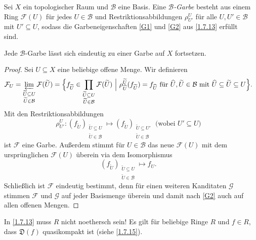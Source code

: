 \documentclass[a4paper,12pt,index=toc]{scrbook}
\theoremstyle{keinenummern} %
\newcommand{\D}{\mathfrak{D}}
\def\B{\mathcal{B}}
\newcommand{\F}{\mathcal{F}}
\def\G{\mathcal{G}}
\newcommand{\schlange}[1]{\widetilde{#1}}
\newcommand{\dach}{\widehat}
\begin{document}
\begin{lem}\label{1.7.14}
  Sei $X$ ein topologischer Raum und $\B$ eine Basis. Eine \emph{$\B$-Garbe\index{$\B$-Garbe}} besteht aus einem Ring
  $\F(U)$ für jedes $U\in\B$ und Restriktionsabbildungen $\rho_{U'}^U$ für alle $U,U'\in\B$ mit
  $U'\subseteq U$, sodass die Garbeneigenschaften \ref{G1} und \ref{G2} aus \cref{1.7.13} erfüllt sind.

  Jede $\B$-Garbe lässt sich eindeutig zu einer Garbe auf $X$ fortsetzen.
\end{lem}
\begin{proof}
  Sei $U\subseteq X$ eine beliebige offene Menge. Wir definieren
  \begin{equation*} \F_U = \varprojlim_{\substack{\schlange{U}\subseteq U\\\schlange{U}\in\B}}\F(\schlange{U}) =
     \Bigl\{f_{\schlange{U}}\in\prod_{\substack{\schlange{U}\subseteq U\\\schlange{U}\in\B}}\F(\schlange{U}) \ \Big|\ 
     \rho_{\dach{U}}^{\schlange{U}}(f_{\schlange{U}})=f_{\dach{U}}\text{ für }
     \dach{U},\schlange{U}\in\B \text{ mit } \dach{U}\subseteq\schlange{U}\subseteq U \Bigr\}. \end{equation*}
     Mit den Restriktionsabbildungen
     \begin{equation*}\rho_{U'}^U\colon (f_{\schlange{U}})_{\substack{\schlange{U}\subseteq U\\\schlange{U}\in\B}} \mapsto
     (f_{\schlange{U}})_{\substack{\schlange{U}\subseteq U'\\\schlange{U}\in\B}} \text{ (wobei $U'\subseteq U$)}\end{equation*} 
     ist $\F$ eine
     Garbe. Außerdem stimmt für $U\in\B$ das neue $\F(U)$ mit dem ursprünglichen $\F(U)$ überein via
     dem Isomorphismus 
     \begin{equation*}(f_{\schlange{U}})_{\substack{\schlange{U}\subseteq U\\\schlange{U}\in\B}} \mapsto f_U.\end{equation*}
     Schließlich ist $\F$ eindeutig bestimmt, denn für einen weiteren Kanditaten $\G$ stimmen $\F$
     und $\G$ auf jeder Basismenge überein und damit nach \ref{G2} auch auf allen offenen Mengen.
\end{proof}

\begin{bem*}
  In \cref{1.7.13} muss $R$ nicht noethersch sein! Es gilt für beliebige Ringe $R$ und $f\in R$, dass $\D(f)$ quasikompakt ist
  (siehe \cref{1.7.15}).
\end{bem*}
\end{document}
